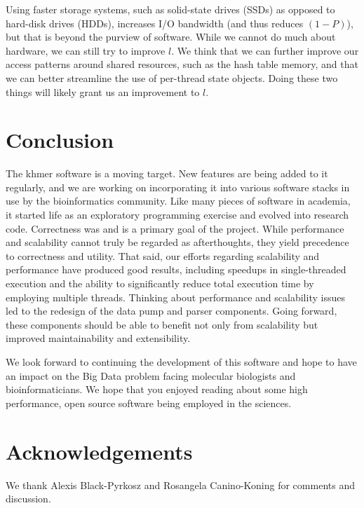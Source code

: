 Using faster storage systems, such as solid-state drives (SSDs) as opposed to
hard-disk drives (HDDs), increases I/O bandwidth (and thus reduces $(1 - P)$),
but that is beyond the purview of software. While we cannot do much about
hardware, we can still try to improve $l$. We think that we can further improve
our access patterns around shared resources, such as the hash table memory, and
that we can better streamline the use of per-thread state objects. Doing these
two things will likely grant us an improvement to $l$.

\section{Conclusion}

The khmer software is a moving target. New features are being added to it
regularly, and we are working on incorporating it into various software stacks
in use by the bioinformatics community. Like many pieces of software in
academia, it started life as an exploratory programming exercise and evolved
into research code.  Correctness was and is a primary goal of the project.
While performance and scalability cannot truly be regarded as afterthoughts,
they yield precedence to correctness and utility. That said, our efforts
regarding scalability and performance have produced good results, including
speedups in single-threaded execution and the ability to significantly reduce
total execution time by employing multiple threads. Thinking about performance
and scalability issues led to the redesign of the data pump and parser
components. Going forward, these components should be able to benefit not only
from scalability but improved maintainability and extensibility.

We look forward to continuing the development of this software and hope to have
an impact on the Big Data problem facing molecular biologists and
bioinformaticians. We hope that you enjoyed reading about some high
performance, open source software being employed in the sciences.

\section{Acknowledgements}

We thank Alexis Black-Pyrkosz and Rosangela Canino-Koning for comments and
discussion.

% 
% 
